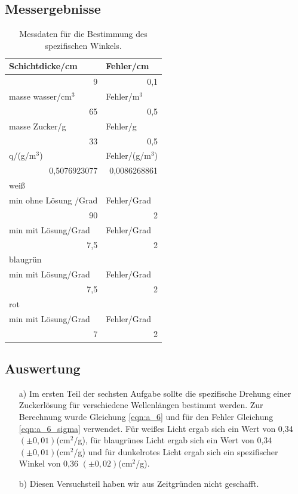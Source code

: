 \documentclass[12pt]{scrartcl}
\begin{document}
\subsection{Messergebnisse}
\begin{table}[htbp]
\caption{Messdaten für die Bestimmung des spezifischen Winkels.}
\begin{center}
\begin{tabular}{|l|l|}
\hline
Schichtdicke/cm & Fehler/cm \\ \hline
\multicolumn{1}{|r|}{9} & \multicolumn{1}{r|}{0,1} \\ \hline
masse wasser/cm$^3$ & Fehler/m$^3$ \\ \hline
\multicolumn{1}{|r|}{65} & \multicolumn{1}{r|}{0,5} \\ \hline
masse Zucker/g & Fehler/g \\ \hline
\multicolumn{1}{|r|}{33} & \multicolumn{1}{r|}{0,5} \\ \hline
q/(g/m$^3$) & Fehler/(g/m$^3$) \\ \hline
\multicolumn{1}{|r|}{0,5076923077} & \multicolumn{1}{r|}{0,0086268861} \\ \hline
weiß &  \\ \hline
min ohne Lösung /Grad & Fehler/Grad \\ \hline
\multicolumn{1}{|r|}{90} & \multicolumn{1}{r|}{2} \\ \hline
min mit Lösung/Grad & Fehler/Grad \\ \hline
\multicolumn{1}{|r|}{7,5} & \multicolumn{1}{r|}{2} \\ \hline
blaugrün &  \\ \hline
min mit Lösung/Grad & Fehler/Grad \\ \hline
\multicolumn{1}{|r|}{7,5} & \multicolumn{1}{r|}{2} \\ \hline
rot &  \\ \hline
min mit Lösung/Grad & Fehler/Grad \\ \hline
\multicolumn{1}{|r|}{7} & \multicolumn{1}{r|}{2} \\ \hline
\end{tabular}
\end{center}
\label{tab:a_6}
\end{table}
\subsection{Auswertung}
\begin{enumerate}
\item[a)]
Im ersten Teil der sechsten Aufgabe sollte die spezifische Drehung einer Zuckerlösung für verschiedene Wellenlängen bestimmt werden. Zur Berechnung wurde Gleichung \ref{eqn:a_6} und für den Fehler Gleichung \ref{eqn:a_6_sigma} verwendet. Für weißes Licht ergab sich ein Wert von 0,34 $(\pm 0,01)$(cm$^2$/g), für blaugrünes Licht ergab sich ein Wert von 0,34 $(\pm 0,01)$(cm$^2$/g) und für dunkelrotes Licht ergab sich ein spezifischer Winkel von 0,36 $(\pm 0,02)$(cm$^2$/g).

\item[b)]
Diesen Versuchsteil haben wir aus Zeitgründen nicht geschafft.
\end{enumerate}
\end{document}
